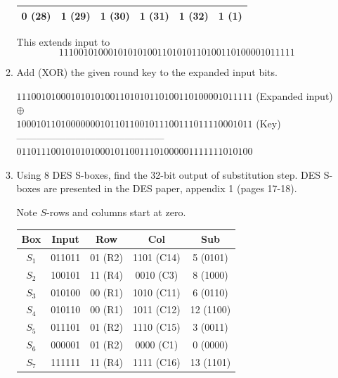\documentclass[12pt]{article}
\newenvironment{answer}
{ \begin{tcolorbox}[halign=left]
    }
    {  
  \end{tcolorbox}
}
\begin{document}
\begin{enumerate}
\begin{enumerate}
\begin{answer}
\begin{center}
\begin{tabular}{|c|c|c|c|c|c|}
          \hline
          0 (28) & 1 (29) & 1 (30) & 1 (31) & 1 (32) & 1 (1) \\ 
          \hline
        \end{tabular}
      \end{center}
      This extends input to
      \[ 111001010001010101001101010110100110100001011111 \]
      \end{answer}
    \item Add (XOR) the given round key to the expanded input bits.
      \begin{answer}
        $111001010001010101001101010110100110100001011111$ (Expanded input)\\
        \hspace{5.8cm} $\oplus$ \\
        $100010110100000001011011001011100111011110001011$ (Key) \\
        --------------------------------------------- \\
        $011011 100101 010100 010110 011101 000001 111111 010100$ \\
      \end{answer}
    \item Using 8 DES S-boxes, find the 32-bit output of substitution step. DES S-boxes are
      presented in the DES paper, appendix 1 (pages 17-18).
      \begin{answer}
        Note $S$-rows and columns start at zero.
        \begin{center}
          \begin{tabular}{|c|c|c|c|c|}
            \hline
            \textbf{Box} & \textbf{Input} & \textbf{Row} & \textbf{Col} & \textbf{Sub} \\
            \hline
            $S_1$ & 011011 & 01 (R2) & 1101 (C14) & 5 (0101) \\
            \hline
            $S_2$ & 100101 & 11 (R4) & 0010 (C3) & 8 (1000)\\
            \hline
            $S_3$ & 010100 & 00 (R1) & 1010 (C11) & 6 (0110)\\
            \hline
            $S_4$ & 010110 & 00 (R1) & 1011 (C12) & 12 (1100) \\
            \hline
            $S_5$ & 011101 & 01 (R2) & 1110 (C15) & 3 (0011)\\
            \hline
            $S_6$ & 000001 & 01 (R2) & 0000 (C1) & 0 (0000) \\
            \hline
            $S_7$ & 111111 & 11 (R4) & 1111 (C16) & 13 (1101) \\

\end{tabular}
\end{center}
\end{answer}
\end{enumerate}
\end{enumerate}
\end{document}
